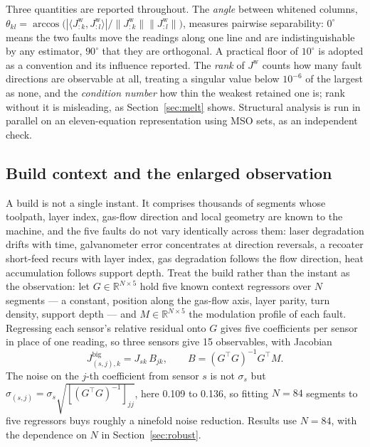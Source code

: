 \documentclass[preprint,times]{elsarticle}
\begin{document}
Three quantities are reported throughout. The \emph{angle} between whitened
columns, $\theta_{kl} = \arccos\big(|\langle J^{\mathrm{w}}_{:k},
J^{\mathrm{w}}_{:l}\rangle| / \|J^{\mathrm{w}}_{:k}\|
\|J^{\mathrm{w}}_{:l}\|\big)$, measures pairwise separability: $0^\circ$ means
the two faults move the readings along one line and are indistinguishable by any
estimator, $90^\circ$ that they are orthogonal. A practical floor of $10^\circ$
is adopted as a convention and its influence reported. The \emph{rank} of
$J^{\mathrm{w}}$ counts how many fault directions are observable at all, treating
a singular value below $10^{-6}$ of the largest as none, and the \emph{condition
number} how thin the weakest retained one is; rank without it is misleading, as
Section~\ref{sec:melt} shows. Structural analysis is run in parallel on an
eleven-equation representation using MSO sets, as an independent check.

\subsection{Build context and the enlarged observation}
\label{sec:context}

A build is not a single instant. It comprises thousands of segments whose
toolpath, layer index, gas-flow direction and local geometry are known to the
machine, and the five faults do not vary identically across them: laser
degradation drifts with time, galvanometer error concentrates at direction
reversals, a recoater short-feed recurs with layer index, gas degradation follows
the flow direction, heat accumulation follows support depth. Treat the build
rather than the instant as the observation: let $G\in\mathbb{R}^{N\times 5}$ hold
five known context regressors over $N$ segments --- a constant, position along
the gas-flow axis, layer parity, turn density, support depth --- and
$M\in\mathbb{R}^{N\times 5}$ the modulation profile of each fault. Regressing
each sensor's relative residual onto $G$ gives five coefficients per sensor in
place of one reading, so three sensors give 15 observables, with Jacobian
%
\begin{equation}
J^{\mathrm{big}}_{(s,j),k} = J_{sk}\,B_{jk},
\qquad B = (G^{\!\top}G)^{-1}G^{\!\top}M .
\label{eq:big}
\end{equation}
%
The noise on the $j$-th coefficient from sensor $s$ is not $\sigma_s$ but
$\sigma_{(s,j)} = \sigma_s\sqrt{[(G^{\!\top}G)^{-1}]_{jj}}$, here 0.109 to 0.136, so fitting $N=84$ segments to five regressors buys roughly
a ninefold noise reduction. Results use $N=84$, with the dependence on $N$ in
Section~\ref{sec:robust}.
\end{document}
